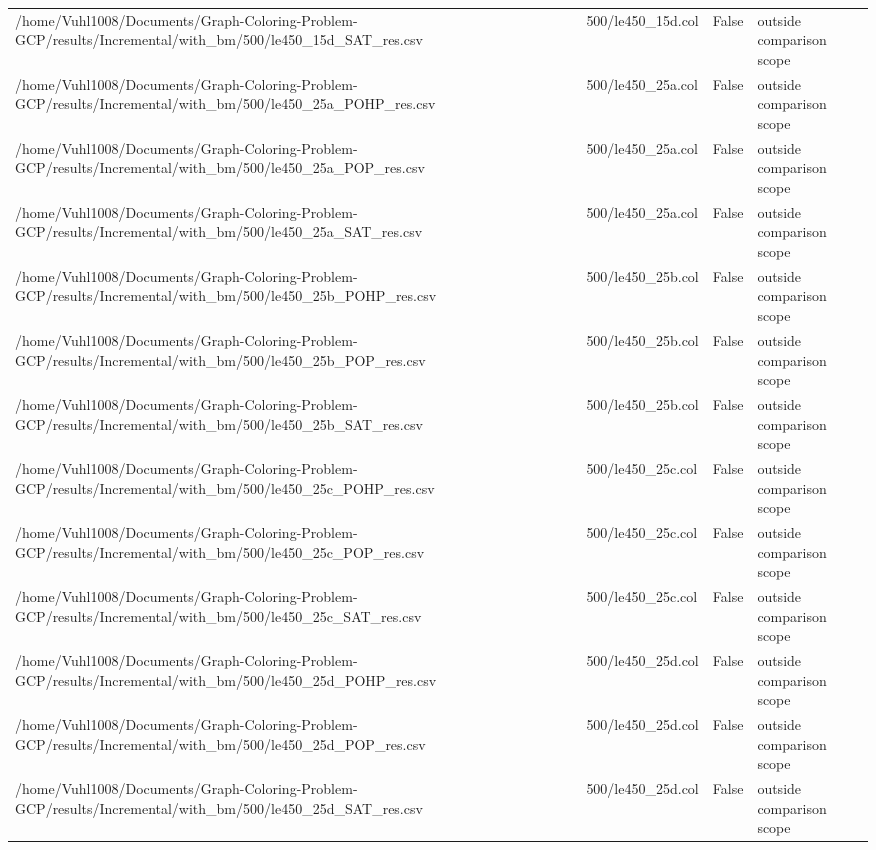 \begin{table}[htbp]
\begin{tabular}{llll}
/home/Vuhl1008/Documents/Graph-Coloring-Problem-GCP/results/Incremental/with\_bm/500/le450\_15d\_SAT\_res.csv & 500/le450\_15d.col & False & outside comparison scope \\
/home/Vuhl1008/Documents/Graph-Coloring-Problem-GCP/results/Incremental/with\_bm/500/le450\_25a\_POHP\_res.csv & 500/le450\_25a.col & False & outside comparison scope \\
/home/Vuhl1008/Documents/Graph-Coloring-Problem-GCP/results/Incremental/with\_bm/500/le450\_25a\_POP\_res.csv & 500/le450\_25a.col & False & outside comparison scope \\
/home/Vuhl1008/Documents/Graph-Coloring-Problem-GCP/results/Incremental/with\_bm/500/le450\_25a\_SAT\_res.csv & 500/le450\_25a.col & False & outside comparison scope \\
/home/Vuhl1008/Documents/Graph-Coloring-Problem-GCP/results/Incremental/with\_bm/500/le450\_25b\_POHP\_res.csv & 500/le450\_25b.col & False & outside comparison scope \\
/home/Vuhl1008/Documents/Graph-Coloring-Problem-GCP/results/Incremental/with\_bm/500/le450\_25b\_POP\_res.csv & 500/le450\_25b.col & False & outside comparison scope \\
/home/Vuhl1008/Documents/Graph-Coloring-Problem-GCP/results/Incremental/with\_bm/500/le450\_25b\_SAT\_res.csv & 500/le450\_25b.col & False & outside comparison scope \\
/home/Vuhl1008/Documents/Graph-Coloring-Problem-GCP/results/Incremental/with\_bm/500/le450\_25c\_POHP\_res.csv & 500/le450\_25c.col & False & outside comparison scope \\
/home/Vuhl1008/Documents/Graph-Coloring-Problem-GCP/results/Incremental/with\_bm/500/le450\_25c\_POP\_res.csv & 500/le450\_25c.col & False & outside comparison scope \\
/home/Vuhl1008/Documents/Graph-Coloring-Problem-GCP/results/Incremental/with\_bm/500/le450\_25c\_SAT\_res.csv & 500/le450\_25c.col & False & outside comparison scope \\
/home/Vuhl1008/Documents/Graph-Coloring-Problem-GCP/results/Incremental/with\_bm/500/le450\_25d\_POHP\_res.csv & 500/le450\_25d.col & False & outside comparison scope \\
/home/Vuhl1008/Documents/Graph-Coloring-Problem-GCP/results/Incremental/with\_bm/500/le450\_25d\_POP\_res.csv & 500/le450\_25d.col & False & outside comparison scope \\
/home/Vuhl1008/Documents/Graph-Coloring-Problem-GCP/results/Incremental/with\_bm/500/le450\_25d\_SAT\_res.csv & 500/le450\_25d.col & False & outside comparison scope \\

\end{tabular}
\end{table}
